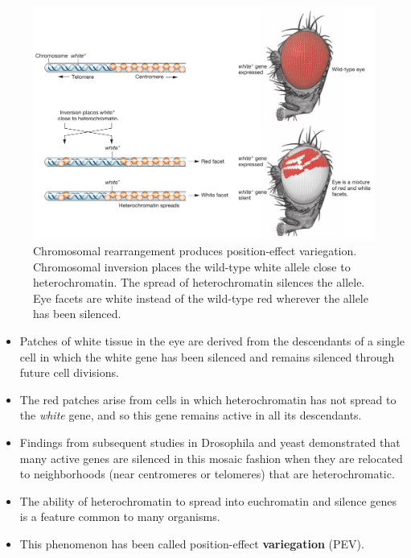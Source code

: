 \documentclass[11pt,dvipsnames,ignorenonframetext,aspectratio=169]{beamer}
\providecommand{\tightlist}{%
  \setlength{\itemsep}{0pt}\setlength{\parskip}{0pt}}
\begin{document}
\begin{frame}{}
\protect\hypertarget{section}{}

\begin{figure}
\includegraphics[width=0.55\linewidth]{./../images/drosophila_chromosomal_rearrangement_pev} \caption{Chromosomal rearrangement produces position-effect variegation. Chromosomal inversion places the wild-type white allele close to heterochromatin. The spread of heterochromatin silences the allele. Eye facets are white instead of the wild-type red wherever the allele has been silenced.}\label{fig:chromosomal-rearrangement-pev}
\end{figure}

\end{frame}

\begin{frame}{}
\protect\hypertarget{section-1}{}

\begin{itemize}
\tightlist
\item
  Patches of white tissue in the eye are derived from the descendants of
  a single cell in which the white gene has been silenced and remains
  silenced through future cell divisions.
\item
  The red patches arise from cells in which heterochromatin has not
  spread to the \emph{white} gene, and so this gene remains active in
  all its descendants.
\item
  Findings from subsequent studies in Drosophila and yeast demonstrated
  that many active genes are silenced in this mosaic fashion when they
  are relocated to neighborhoods (near centromeres or telomeres) that
  are heterochromatic.
\item
  The ability of heterochromatin to spread into euchromatin and silence
  genes is a feature common to many organisms.
\item
  This phenomenon has been called position-effect \textbf{variegation}
  (PEV).
\end{itemize}

\end{frame}
\end{document}
